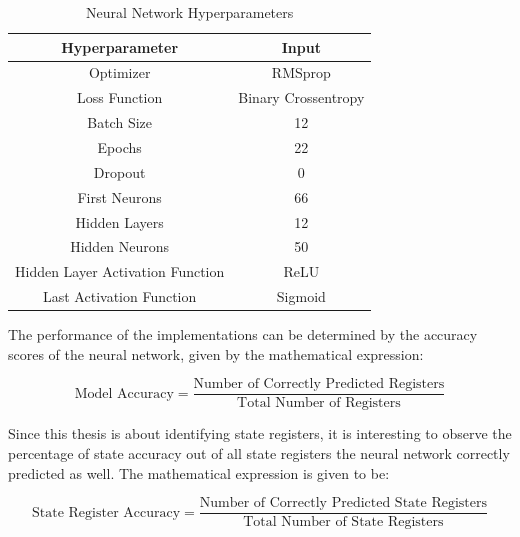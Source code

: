 \documentclass{tum-book}
\begin{document}
            \begin{table}[ht]
                \centering
                \begin{tabular}{|c|c|}
                \hline
                Hyperparameter & Input\\
                \hline
                \hline
                Optimizer & RMSprop  \\
                \hline
                Loss Function & Binary Crossentropy  \\
                \hline
                Batch Size & 12 \\
                \hline
                Epochs & 22\\
                \hline
                Dropout & 0 \\
                \hline
                First Neurons & 66  \\
                \hline
                Hidden Layers & 12  \\
                \hline
                Hidden Neurons & 50  \\
                \hline
                Hidden Layer Activation Function & ReLU\\
                \hline
                Last Activation Function & Sigmoid\\
                \hline
                \end{tabular}
                \caption{Neural Network Hyperparameters}
                \label{tab:Neural Network Hyperparameters}
            \end{table}
            
        \noindent
        The performance of the implementations can be determined by the accuracy scores of the neural network, given by the mathematical expression:
        
        \begin{equation}
            \label{eqn:model accuracy equation}
            \text{Model Accuracy}= \frac{\text{Number of Correctly Predicted Registers}}{\text{Total Number of Registers}}
        \end{equation}
        
        \noindent
        Since this thesis is about identifying state registers, it is interesting to observe the percentage of state accuracy out of all state registers the neural network correctly predicted as well. The mathematical expression is given to be:
        
        \begin{equation}
            \label{eqn:state register accuracy equation}
            \text{State Register Accuracy}= \frac{\text{Number of Correctly Predicted State Registers}}{\text{Total Number of State Registers}}          
        \end{equation}
\end{document}
